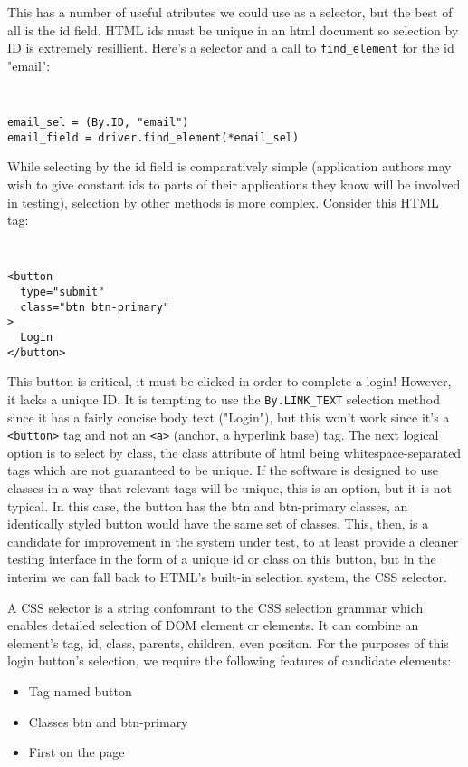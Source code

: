 This has a number of useful atributes we could use as a selector, but the best of all is the id field. HTML ids must be unique in an html document \citep{HTMLStan99} so selection by ID is extremely resillient. Here's a selector and a call to \texttt{find\_element} for the id "email":

{\tt
\begin{verbatim}
email_sel = (By.ID, "email")
email_field = driver.find_element(*email_sel)
\end{verbatim}
}

While selecting by the id field is comparatively simple (application authors may wish to give constant ids to parts of their applications they know will be involved in testing), selection by other methods is more complex. Consider this HTML tag:

{\tt
\begin{verbatim}
<button
  type="submit"
  class="btn btn-primary"
>
  Login
</button>
\end{verbatim}
}

This button is critical, it must be clicked in order to complete a login! However, it lacks a unique ID. It is tempting to use the \texttt{By.LINK\_TEXT} selection method since it has a fairly concise body text ("Login"), but this won't work since it's a \texttt{<button>} tag and not an \texttt{<a>} (anchor, a hyperlink base) tag. The next logical option is to select by class, the class attribute of html being whitespace-separated tags which are not guaranteed to be unique. If the software is designed to use classes in a way that relevant tags will be unique, this is an option, but it is not typical. In this case, the button has the btn and btn-primary classes, an identically styled button would have the same set of classes. This, then, is a candidate for improvement in the system under test, to at least provide a cleaner testing interface in the form of a unique id or class on this button, but in the interim we can fall back to HTML's built-in selection system, the CSS selector.

A CSS selector is a string confomrant to the CSS selection grammar \citep{Selector54} which enables detailed selection of DOM element or elements. It can combine an element's tag, id, class, parents, children, even positon. For the purposes of this login button's selection, we require the following features of candidate elements:
\begin{itemize}
\item Tag named button
\item Classes btn and btn-primary
\item First on the page
\end{itemize}

